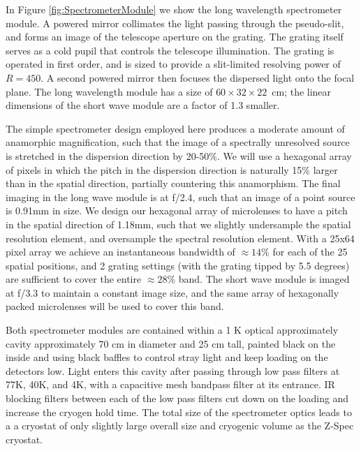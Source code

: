 In Figure \ref{fig:SpectrometerModule} we show the long wavelength spectrometer module. A powered mirror collimates the light passing through the pseudo-slit, and forms an image of the telescope aperture on the grating. The grating itself serves
as a cold pupil that controls the telescope illumination. The grating is
operated in first order, and is sized to provide a slit-limited resolving
power of $R=450$. A second powered mirror then focuses the dispersed light
onto the focal plane. The long wavelength module has a size of $60 \times 32 \times
22$~cm; the linear dimensions of the short wave module are a factor of
1.3 smaller.

The simple spectrometer design employed here produces a moderate amount of
anamorphic magnification, such that the image of a spectrally unresolved
source is stretched in the dispersion direction by 20-50\%. We will use a
hexagonal array of pixels in which the pitch in the dispersion direction
is naturally 15\% larger than in the spatial direction, partially
countering this anamorphism. The final imaging in the long wave module is
at f/2.4, such that an image of a point source is 0.91mm in size. We
design our hexagonal array of microlenses to have a pitch in the spatial
direction of 1.18mm, such that we slightly undersample the spatial
resolution element, and oversample the spectral resolution element. With a
25x64 pixel array we achieve an instantaneous bandwidth of $\approx$$14\%$
for each of the 25 spatial positions, and 2 grating settings (with the
grating tipped by 5.5 degrees) are sufficient to cover the entire
$\approx$$28\%$ band. The short wave module is imaged at f/3.3 to maintain
a constant image size, and the same array of hexagonally packed
microlenses will be used to cover this band.
 
Both spectrometer modules are contained within a 1 K optical approximately cavity approximately 70 cm in diameter and 25 cm tall, painted black on the inside and using black baffles to control stray light and keep loading on the detectors low. Light enters this cavity after passing through low pass filters at 77K, 40K, and 4K, with a capacitive mesh bandpass filter at its entrance.  IR blocking
filters between each of the low pass filters cut down on the loading
and increase the cryogen hold time.  The total size of the spectrometer optics leads to a a cryostat of only slightly large overall size and cryogenic volume as the Z-Spec cryostat.
 

